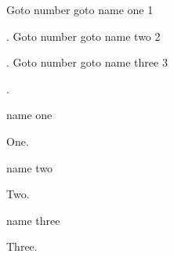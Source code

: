 
\newif\ifhint

\ifx\HINTversion\undefined
  \hintfalse
\else 
  \hinttrue
\fi



\def\txtlink#1#2{%
\ifhint\HINTstartlink goto name {#1} \hbox{\rm #2}\HINTendlink
\else\hbox{\rm #1}\fi
}

\def\txttarget#1{%
\ifhint\HINTdest name {#1}\relax
\else\relax
\fi
}

Goto number \txtlink{one}{1}.
Goto number \txtlink{two}{2}.
Goto number \txtlink{three}{3}.

\vfill\break
\txttarget{one}One.

\vfill\break
\txttarget{two}Two.

\vfill\break
\txttarget{three}Three.

\bye


